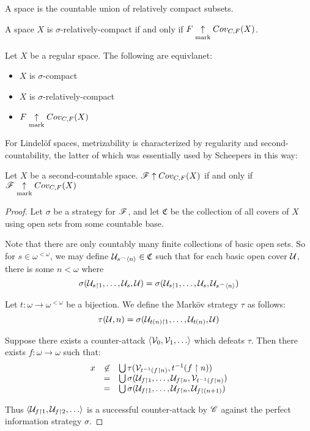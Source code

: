 \begin{defn}
  A  space is the countable union of
  relatively compact subsets.
\end{defn}

\begin{cor}
  A space $X$ is $\sigma$-relatively-compact if and only if
  $F \underset{\text{mark}}{\uparrow} Cov_{C,F}(X)$.
\end{cor}

\begin{cor}
  Let $X$ be a regular space. The following are equivlanet:
  \begin{itemize}
    \item $X$ is $\sigma$-compact
    \item $X$ is $\sigma$-relatively-compact
    \item $F \underset{\text{mark}}{\uparrow} Cov_{C,F}(X)$
  \end{itemize}
\end{cor}

For Lindel\"of spaces, metrizability is characterized by regularity and
second-countability, the latter of which was essentially used by Scheepers in
this way:

\begin{lem}
  Let $X$ be a second-countable space. $\mathscr{F}\uparrow Cov_{C,F}(X)$ if and only if
  $\mathscr{F}\underset{\text{mark}}{\uparrow}Cov_{C,F}(X)$
\end{lem}

\begin{proof}
  Let $\sigma$ be a strategy for $\mathscr{F}$, and let $\mathfrak{C}$ be the
  collection of all covers of $X$ using open sets from some countable
  base.

  Note that there are only
  countably many finite collections of basic open sets. So for
  $s\in\omega^{<\omega}$, we may define $\mathcal{U}_{s{^\frown}\langle n\rangle}\in\mathfrak C$
  such that for each basic open cover $\mathcal{U}$, there is some $n<\omega$ where
  \[
    \sigma(\mathcal{U}_{s\restriction 1},\dots,\mathcal{U}_{s},\mathcal{U})
      =
    \sigma(\mathcal{U}_{s\restriction 1},\dots,\mathcal{U}_{s},\mathcal{U}_{s{^\frown}\langle n\rangle})
  \]

  Let $t:\omega\to\omega^{<\omega}$ be a bijection. We define the Mark\"ov
  strategy $\tau$ as follows:
  \[
    \tau(\mathcal{U},n) = \sigma(\mathcal{U}_{t(n)\restriction 1},\dots,\mathcal{U}_{t(n)},\mathcal{U})
  \]

  Suppose there exists a counter-attack $\<\mc V_0,\mc V_1,\dots\>$ which
  defeats $\tau$. Then there exists
  $f:\omega\to\omega$ such that:
  \[
    \begin{array}{rcl}
    x & \not\in & \bigcup \tau(\mathcal{V}_{t^{-1}(f\restriction n)},t^{-1}(f\restriction n)) \\
    & = & \bigcup\sigma(\mathcal{U}_{f\restriction 1},\dots,\mathcal{U}_{f\restriction n},\mathcal{V}_{t^{-1}(f\restriction n)}) \\
    & = & \bigcup\sigma(\mathcal{U}_{f\restriction 1},\dots,\mathcal{U}_{f\restriction n},\mathcal{U}_{f\restriction (n+1)})
    \end{array}
  \]

  Thus $\<\mc U_{f\rest 1}, \mc U_{f\rest 2},\dots\>$ is a successful
  counter-attack by $\mathscr{C}$ against the perfect information strategy $\sigma$.
\end{proof}


